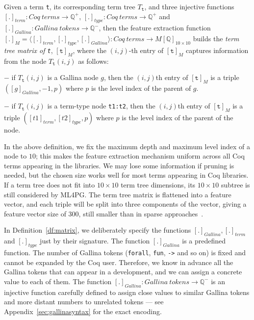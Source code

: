 \begin{definition}\label{df:matrix}
Given a term \lstinline?t?, its corresponding term tree $T_{\texttt{t}}$, and three injective functions 
$[.]_{term}: Coq~terms \rightarrow \mathbb{Q}^+$, $[.]_{type}: Coq~terms \rightarrow \mathbb{Q}^+$
and $[.]_{Gallina}: Gallina~tokens \rightarrow \mathbb{Q}^-$, then the feature extraction function 
$[.]_M=\langle[.]_{term}, [.]_{type},[.]_{Gallina}\rangle : Coq~terms \rightarrow M[\mathbb{Q}]_{10\times 10}$
builds the  \emph{term tree matrix of \texttt{t}}, $[\texttt{t}]_M$,
where the $(i,j)$-th entry of $[\texttt{t}]_M$ captures information from the node $T_{\texttt{t}}(i,j)$ as follows:

$-$ if $T_{\texttt{t}}(i,j)$ is a Gallina node $g$, then the $(i,j)$th entry of $[\texttt{t}]_M$ is a triple $([g]_{Gallina},-1,p)$ 
where $p$ is the level index of the parent of $g$. %

$-$ if $T_{\texttt{t}}(i,j)$ is a term-type node \lstinline?t1:t2?, then the $(i,j)$th entry of $[\texttt{t}]_M$ is a triple $([t1]_{term},[t2]_{type},p)$
where $p$ is the level index of the parent of the node.




\end{definition}




In the above definition, we fix  the maximum depth and  maximum level index of a node to $10$; this makes the feature extraction mechanism uniform
across all Coq terms appearing in the libraries. We may lose some information if  pruning is needed, but the chosen size works well for most terms appearing in Coq libraries. 
If a term tree does not fit into $10 \times 10$ term tree dimensions, its $10 \times 10$
subtree is still considered by ML4PG.
The term tree matrix is flattened into a feature vector, and each triple will be split 
into three components of the vector, giving a feature vector size of $300$, %
still smaller than in sparse approaches~\cite{lpar-urban,K13,UrbanSPV08}. 


In Definition~\ref{df:matrix}, we deliberately specify the functions $[.]_{Gallina}, [.]_{term}$ and $[.]_{type}$ just by their signature. 
The function $[.]_{Gallina}$ is a predefined function.
The number of Gallina tokens (\lstinline?forall?, \lstinline?fun?, \lstinline?->? and so on) is fixed and cannot be 
expanded by the Coq user. Therefore, we know in advance all the Gallina tokens that can appear in a development, and we can
assign a concrete value to each of them. The function $[.]_{Gallina}: Gallina~tokens  \rightarrow \mathbb{Q}^-$ is an injective 
function carefully defined to assign close values to similar Gallina tokens %
and more distant numbers to unrelated tokens 
--- see Appendix~\ref{sec:gallinasyntax} for the exact encoding.

